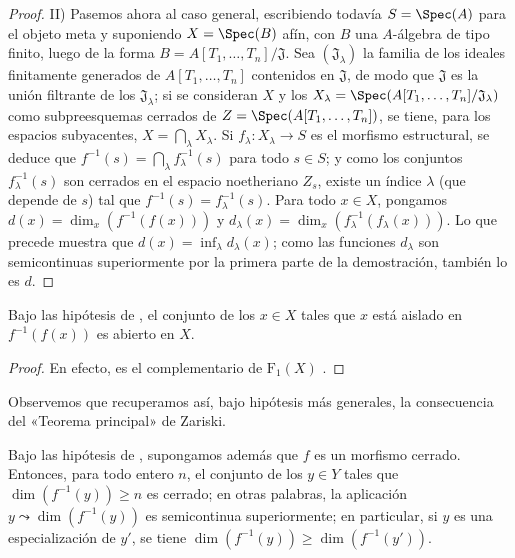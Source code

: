 \begin{proof}
II) Pasemos ahora al caso general, escribiendo todavía $S=\Spec(A)$ para el objeto meta y suponiendo $X=\Spec(B)$ afín, con $B$ una $A$-álgebra de tipo finito, luego de la forma
$B=A[T_1,\ldots,T_n]/\mathfrak{J}$.
Sea $(\mathfrak{J}_\lambda)$ la familia de los ideales finitamente generados de $A[T_1,\ldots,T_n]$ contenidos en $\mathfrak{J}$, de modo que $\mathfrak{J}$ es la unión filtrante de los $\mathfrak{J}_\lambda$; si se consideran $X$ y los $X_\lambda=\Spec(A[T_1,\ldots,T_n]/\mathfrak{J}_\lambda)$ como subpreesquemas cerrados de $Z=\Spec(A[T_1,\ldots,T_n])$, se tiene, para los espacios subyacentes, $X=\bigcap_\lambda X_\lambda$.
Si $f_\lambda:X_\lambda\to S$ es el morfismo estructural, se deduce que $f^{-1}(s)=\bigcap_\lambda f_\lambda^{-1}(s)$ para todo $s\in S$; y como los conjuntos $f_\lambda^{-1}(s)$ son cerrados en el espacio noetheriano $Z_s$, existe un índice $\lambda$ (que depende de $s$) tal que $f^{-1}(s)=f_\lambda^{-1}(s)$.
Para todo $x\in X$, pongamos $d(x)=\dim_x(f^{-1}(f(x)))$ y $d_\lambda(x)=\dim_x(f_\lambda^{-1}(f_\lambda(x)))$. Lo que precede muestra que $d(x)=\inf_\lambda d_\lambda(x)$; como las funciones $d_\lambda$ son semicontinuas superiormente por la primera parte de la demostración, también lo es $d$.
\end{proof}

\begin{corollary}[13.1.4]
\label{IV.13.1.4}
Bajo las hipótesis de , el conjunto de los $x\in X$ tales que $x$ está aislado en $f^{-1}(f(x))$ es abierto en $X$.
\end{corollary}

\begin{proof}
En efecto, es el complementario de $\mathrm{F}_1(X)$ .
\end{proof}

Observemos que recuperamos así, bajo hipótesis más generales, la consecuencia  del «Teorema principal» de Zariski.

\begin{corollary}[13.1.5]
\label{IV.13.1.5}
Bajo las hipótesis de , supongamos además que $f$ es un morfismo cerrado.
Entonces, para todo entero $n$, el conjunto de los $y\in Y$ tales que $\dim(f^{-1}(y))\geq n$ es cerrado; en otras palabras, la aplicación $y\leadsto\dim(f^{-1}(y))$ es semicontinua superiormente; en particular, si $y$ es una especialización de $y'$, se tiene $\dim(f^{-1}(y))\geq\dim(f^{-1}(y'))$.
\end{corollary}

